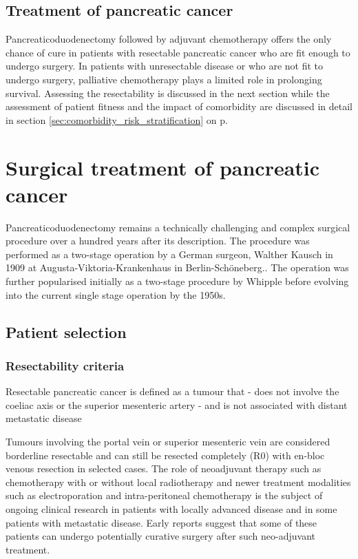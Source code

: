\subsection{Treatment of pancreatic cancer}
Pancreaticoduodenectomy followed by adjuvant chemotherapy offers the only chance of cure in patients with resectable pancreatic cancer who are fit enough to undergo surgery. In patients with unresectable disease or who are not fit to undergo surgery, palliative chemotherapy plays a limited role in prolonging survival. Assessing the resectability is discussed in the next section while the assessment of patient fitness and the impact of comorbidity are discussed in detail in section \ref{sec:comorbidity_risk_stratification} on p\pageref{sec:comorbidity_risk_stratification}.

\section{Surgical treatment of pancreatic cancer}
Pancreaticoduodenectomy remains a technically challenging and complex surgical procedure over a hundred years after its description. The procedure was performed as a two-stage operation by a German surgeon, Walther Kausch in 1909 at Augusta-Viktoria-Krankenhaus in Berlin-Schöneberg.\parencite{kausch_carcinom_1912}. The operation was further popularised initially as a two-stage procedure by Whipple\parencite{whipple_treatment_1935} before evolving into the current single stage operation by the 1950s.\parencite{whipple_rationale_1941,whipple_radical_1950}

\subsection{Patient selection}
\subsubsection{Resectability criteria}
Resectable pancreatic cancer is defined as a tumour that
- does not involve the coeliac axis or the superior mesenteric artery
- and is not associated with distant metastatic disease

Tumours involving the portal vein or superior mesenteric vein are considered borderline resectable and can still be resected completely (R0) with en-bloc venous resection in selected cases. The role of neoadjuvant therapy such as chemotherapy with or without local radiotherapy and newer treatment modalities such as electroporation  and intra-peritoneal chemotherapy is the subject of ongoing clinical research in patients with locally advanced disease and in some patients with metastatic disease. Early reports suggest that some of these patients can undergo potentially curative surgery after such neo-adjuvant treatment.

